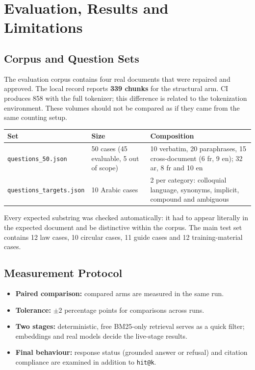 \documentclass[a4paper,12pt,openany]{report}
\begin{document}
\chapter{Evaluation, Results and Limitations}

\section{Corpus and Question Sets}
The evaluation corpus contains four real documents that were repaired and approved. The local
record reports \textbf{339 chunks} for the structural arm. CI produces 858 with the full tokenizer;
this difference is related to the tokenization environment. These volumes should not be compared as
if they came from the same counting setup.

\begin{table}[htbp]
\centering
\small
\begin{tabular}{p{3.6cm}p{3.0cm}p{7.9cm}}
\toprule
\textbf{Set} & \textbf{Size} & \textbf{Composition} \\
\midrule
\texttt{questions\_50.json} & 50 cases (45 evaluable, 5 out of scope) & 10 verbatim,
20 paraphrases, 15 cross-document (6 fr, 9 en); 32 ar, 8 fr and 10 en \\
\texttt{questions\_targets.json} & 10 Arabic cases & 2 per category: colloquial language,
synonyms, implicit, compound and ambiguous \\
\bottomrule
\end{tabular}
\end{table}

Every expected substring was checked automatically: it had to appear literally in the expected
document and be distinctive within the corpus. The main test set contains 12 law cases, 10 circular
cases, 11 guide cases and 12 training-material cases.

\section{Measurement Protocol}
\begin{itemize}
  \item \textbf{Paired comparison:} compared arms are measured in the same run.
  \item \textbf{Tolerance:} $\pm 2$ percentage points for comparisons across runs.
  \item \textbf{Two stages:} deterministic, free BM25-only retrieval serves as a quick filter;
embeddings and real models decide the live-stage results.
  \item \textbf{Final behaviour:} response status (grounded answer or refusal) and citation
compliance are examined in addition to \texttt{hit@k}.
\end{itemize}
\end{document}
